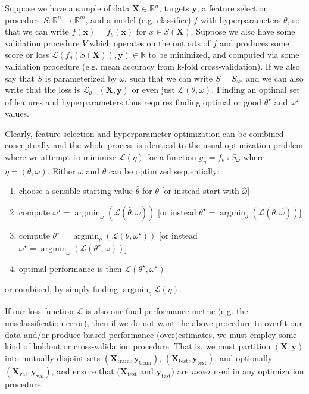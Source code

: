 \documentclass[10pt]{article}
\newcommand{\tsub}[2]{\mathbf{#1}_{\text{#2}}}
\DeclareMathOperator*{\argmin}{\arg\min}
\begin{document}
Suppose we have a sample of data \(\mathbf{X} \in \mathbb{R}^n\), targets \(\mathbf{y}\), a feature
selection procedure \(S: \mathbb{R}^n \rightarrow \mathbb{R}^m\), and a model (e.g. classifier)
\(f\) with hyperparameters \(\theta\), so that we can write \(f(\bm{x}) =
f_{\theta}(\mathbf{x})\) for \(x \in S(\mathbf{X})\).  Suppose we also have some validation
procedure \(V\) which operates on the outputs of \(f\) and produces some score or loss
\(\mathcal{L}(f_{\theta}(S(\mathbf{X})), \mathbf{y}) \in \mathbb{R}\) to be minimized, and computed
via some validation procedure (e.g. mean accuracy from k-fold cross-validation). If we also say that
\(S\) is parameterized by \(\omega\), such that we can write \(S = S_{\omega}\),
and we can also write that the loss is \(\mathcal{L}_{\theta, \omega}(\mathbf{X}, \mathbf{y})\) or even
just \(\mathcal{L}(\theta, \omega)\).
Finding an optimal set of features and hyperparameters thus requires finding optimal or good
\(\theta^{\star}\) and \(\omega^{\star}\) values.

Clearly, feature selection and hyperparameter optimization can be combined conceptually and the
whole process is identical to the usual optimization problem where we attempt to minimize
\(\mathcal{L}(\eta)\) for a function \( g_{\eta} = f_{\theta} \circ
S_{\omega}\) where \( \eta = (\theta, \omega) \). Either \(\omega\) and \(\theta\) can be optimized sequentially:

\begin{enumerate}
  \item choose a sensible starting value \(\hat{\theta}\) for \(\theta\) [or instead start with \(\hat{\omega}\)]
  \item compute \(\omega^{\star} = \argmin_{\omega} \left(\mathcal{L}(\hat{\theta}, \omega)\right)\) [or instead \(\theta^{\star} = \argmin_{\theta} \left(\mathcal{L}(\theta, \hat{\omega})\right)\)]
  \item compute
  \(\theta^{\star} = \argmin_{\theta} \left(\mathcal{L}(\theta, \omega^{\star})\right)\) [or instead
  \(\omega^{\star} = \argmin_{\omega} \left(\mathcal{L}(\theta^{\star}, \omega)\right)\)]
  \item optimal performance is then \(\mathcal{L}(\theta^{\star}, \omega^{\star})\)
\end{enumerate}

or combined, by simply finding \(\argmin_{\eta} \mathcal{L}(\eta)\).

If our loss function \(\mathcal{L}\) is also our final performance metric (e.g. the
misclassification error), then if we do not want the above procedure to overfit our data and/or
produce biased performance (over)estimates, we must employ some kind of holdout or cross-validation
procedure. That is, we must partition \((\mathbf{X}, \mathbf{y})\) into mutually disjoint sets
\((\tsub{X}{train}, \tsub{y}{train})\), \((\tsub{X}{test}, \tsub{y}{test})\), and optionally
\((\tsub{X}{val}, \tsub{y}{val})\), and ensure that  \((\tsub{X}{test}\) and \(\tsub{y}{test})\) are
\emph{never} used in any optimization procedure.
\end{document}
